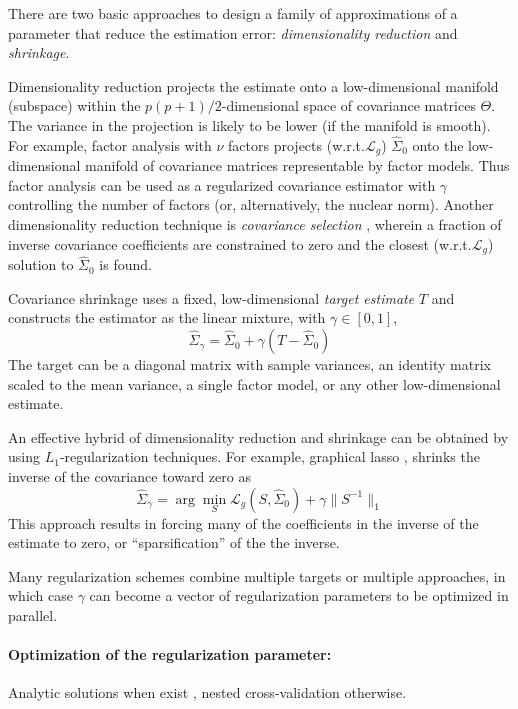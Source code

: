 There are two basic approaches to design a family of approximations of a parameter that reduce the estimation error: \emph{dimensionality reduction} and \emph{shrinkage}.  

Dimensionality reduction projects the estimate onto a low-dimensional manifold (subspace) within the $p(p+1)/2$-dimensional space of covariance matrices $\Theta$.  The variance in the projection is likely to be lower (if the manifold is smooth).  For example, factor analysis with $\nu$ factors projects (w.r.t.\;$\mathcal L_g$) $\hat\Sigma_0$ onto the low-dimensional manifold of covariance matrices representable by factor models. Thus factor analysis can be used as a regularized covariance estimator \citep{Fan:2008} with $\gamma$ controlling the number of factors (or, alternatively, the nuclear norm).  Another dimensionality reduction technique is \emph{covariance selection} \citep{Dempster:1972}, wherein a fraction of inverse covariance coefficients are constrained to zero and the closest (w.r.t.\;$\mathcal L_g$) solution to $\hat\Sigma_0$ is found. 

Covariance shrinkage \citep{Schafer:2005,Ledoit:2004} uses a fixed, low-dimensional \emph{target estimate} $T$ and constructs the estimator as the linear mixture, with $\gamma \in [0,1]$,
\begin{equation}
\hat\Sigma_\gamma = \hat\Sigma_0  + \gamma (T-\hat\Sigma_0) 
\end{equation}
 The target can be a diagonal matrix with sample variances, an identity matrix scaled to the mean variance, a single factor model, or any other low-dimensional estimate.

An effective hybrid of dimensionality reduction and shrinkage can be obtained by using $L_1$-regularization techniques.  For example, graphical lasso \citep{Meinshausen:2006,Friedman:2008}, shrinks the inverse of the covariance toward zero as 
\begin{equation}
\hat\Sigma_\gamma = \arg\min\limits_S \mathcal L_g(S,\hat \Sigma_0) + \gamma \| S^{-1} \|_1
\end{equation}
This approach results in forcing many of the coefficients in the inverse of the estimate to zero, or ``sparsification'' of the the inverse.

Many regularization schemes combine multiple targets or multiple approaches, in which case $\gamma$ can become a vector of regularization parameters \citep{Schafer:2005,Fan:2011,Ma:2013} to be optimized in parallel.

\paragraph{Optimization of the regularization parameter:}
Analytic solutions when exist \citep{Ledoit:2004,Schafer:2005}, nested cross-validation otherwise.

